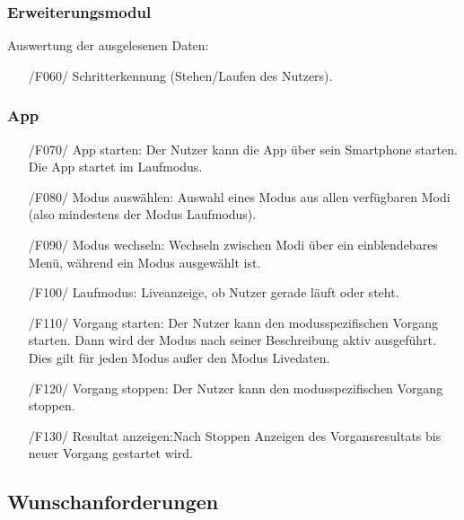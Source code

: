 \documentclass[a4paper,12pt]{article}
\begin{document}
    \subsubsection{Erweiterungsmodul}
     Auswertung der ausgelesenen Daten:
     \begin{itemize}
      \item[/F060/] Schritterkennung (Stehen/Laufen des Nutzers).
    \end{itemize}
    \subsubsection{App}
      \begin{itemize}
      \item[/F070/] \textsf{App starten:} Der Nutzer kann die App über sein Smartphone starten. Die App startet im Laufmodus.%
      \item[/F080/] \textsf{Modus auswählen:} Auswahl eines Modus aus allen verfügbaren Modi (also mindestens der Modus \glqq Laufmodus\grqq). 
      \item[/F090/] \textsf{Modus wechseln:} Wechseln zwischen Modi über ein einblendebares Menü, während ein Modus ausgewählt ist. %
      \item[/F100/] \textsf{Laufmodus:} Liveanzeige, ob Nutzer gerade \glqq läuft\grqq{} oder \glqq steht\grqq{}.
      \item[/F110/] \textsf{Vorgang starten:} Der Nutzer kann den modusspezifischen Vorgang starten. Dann wird der Modus nach seiner Beschreibung aktiv ausgeführt. Dies gilt für jeden Modus außer den Modus \glqq Livedaten\grqq.
      \item[/F120/] \textsf{Vorgang stoppen:} Der Nutzer kann den modusspezifischen Vorgang stoppen.
      \item[/F130/] \textsf{Resultat anzeigen:}Nach Stoppen Anzeigen des Vorgansresultats bis neuer Vorgang gestartet wird.
    \end{itemize}
  \subsection{Wunschanforderungen}
\end{document}
